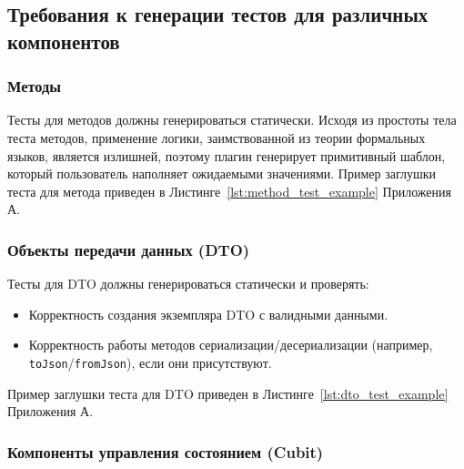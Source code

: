 \documentclass[14pt, russian]{scrartcl}
\begin{document}
\subsection{Требования к генерации тестов для различных компонентов}

\subsubsection{Методы}

Тесты для методов должны генерироваться статически. Исходя из простоты тела теста методов, применение логики, заимствованной из теории формальных языков, является излишней, поэтому плагин генерирует примитивный шаблон, который пользователь наполняет ожидаемыми значениями.
Пример заглушки теста для метода приведен в Листинге~\ref{lst:method_test_example} Приложения А.

\subsubsection{Объекты передачи данных (DTO)}

Тесты для DTO должны генерироваться статически и проверять:
\begin{itemize}
    \item Корректность создания экземпляра DTO с валидными данными.
    \item Корректность работы методов сериализации/десериализации (например, \texttt{toJson}/\texttt{fromJson}), если они присутствуют.
\end{itemize}
Пример заглушки теста для DTO приведен в Листинге~\ref{lst:dto_test_example} Приложения А.

\subsubsection{Компоненты управления состоянием (Cubit)}
\end{document}
